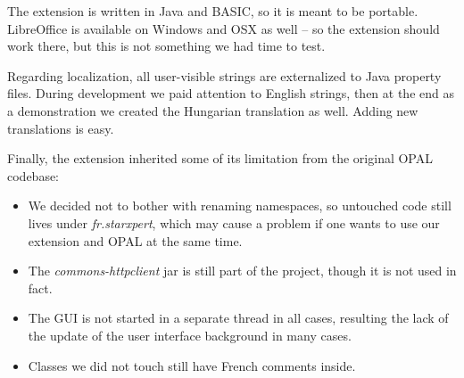 The extension is written in Java and BASIC, so it is meant to be portable.
LibreOffice is available on Windows and OSX as well -- so the extension should
work there, but this is not something we had time to test.

Regarding localization, all user-visible strings are externalized to Java
property files. During development we paid attention to English strings, then at
the end as a demonstration we created the Hungarian translation as well. Adding
new translations is easy.

Finally, the extension inherited some of its limitation from the original OPAL
codebase:

\begin{itemize}
\item We decided not to bother with renaming namespaces, so untouched code still
lives under \emph{fr.starxpert}, which may cause a problem if one wants to use
our extension and OPAL at the same time.
\item The \emph{commons-httpclient} jar is still part of the project, though it is not used in fact.
\item The GUI is not started in a separate thread in all cases, resulting the
lack of the update of the user interface background in many cases.
\item Classes we did not touch still have French comments inside.
\end{itemize}
